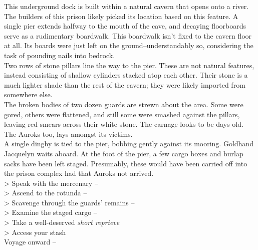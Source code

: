 This underground dock is built within a natural cavern that opens onto a river. The builders of this prison likely picked its location based on this feature. A single pier extends halfway to the mouth of the cave, and decaying floorboards serve as a rudimentary boardwalk. This boardwalk isn’t fixed to the cavern floor at all. Its boards were just left on the ground--understandably so, considering the task of pounding nails into bedrock.\\

Two rows of stone pillars line the way to the pier. These are not natural features, instead consisting of shallow cylinders stacked atop each other. Their stone is a much lighter shade than the rest of the cavern; they were likely imported from somewhere else.\\

The broken bodies of two dozen guards are strewn about the area. Some were gored, others were flattened, and still some were smashed against the pillars, leaving red smears across their white stone. The carnage looks to be days old. The Auroks too, lays amongst its victims.\\

A single dinghy is tied to the pier, bobbing gently against its mooring. Goldhand Jacquelyn waits aboard. At the foot of the pier, a few cargo boxes and burlap sacks have been left staged. Presumably, these would have been carried off into the prison complex had that Auroks not arrived.\\

> Speak with the mercenary -- \\
> Ascend to the rotunda -- \\
> Scavenge through the guards’ remains -- \\
> Examine the staged cargo -- \\
> Take a well-deserved \emph{short reprieve}\\
> Access your stash\\
 Voyage onward -- 